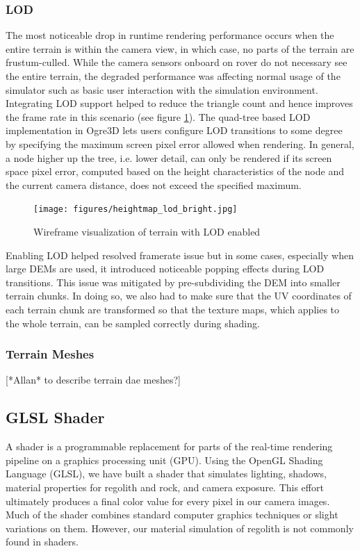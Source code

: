 \documentclass[twocolumn,letterpaper]{IEEEAerospaceCLS}  %
\begin{document}
\subsubsection{LOD}

The most noticeable drop in runtime rendering performance occurs when the entire terrain is within the camera view, in which case, no parts of the terrain are frustum-culled. While the camera sensors onboard on rover do not necessary see the entire terrain, the degraded performance was affecting normal usage of the simulator such as basic user interaction with the simulation environment. Integrating LOD support helped to reduce the triangle count and hence improves the frame rate in this scenario (see figure \ref{fig:heightmaplod}). The quad-tree based LOD implementation in Ogre3D lets users configure LOD transitions to some degree by specifying the maximum screen pixel error allowed when rendering. In general, a node higher up the tree, i.e. lower detail, can only be rendered if its screen space pixel error, computed based on the height characteristics of the node and the current camera distance, does not exceed the specified maximum. 

\begin{figure}[h!]
	\texttt{[image: figures/heightmap\_lod\_bright.jpg]}
   	\caption{Wireframe visualization of terrain with LOD enabled}
    \label{fig:heightmaplod}
\end{figure}

Enabling LOD helped resolved framerate issue but in some cases, especially when large DEMs are used, it introduced noticeable popping effects during LOD transitions. This issue was mitigated by pre-subdividing the DEM into smaller terrain chunks. In doing so, we also had to make sure that the UV coordinates of each terrain chunk are transformed so that the texture maps, which applies to the whole terrain, can be sampled correctly during shading.

\subsubsection{Terrain Meshes}

[*Allan* to describe terrain dae meshes?]

\subsection{GLSL Shader}
A shader is a programmable replacement for parts of the real-time rendering pipeline on a graphics processing unit (GPU). Using the OpenGL Shading Language (GLSL), we have built a shader that simulates lighting, shadows, material properties for regolith and rock, and camera exposure. This effort ultimately produces a final color value for every pixel in our camera images. Much of the shader combines standard computer graphics techniques or slight variations on them. However, our material simulation of regolith is not commonly found in shaders.
\end{document}
